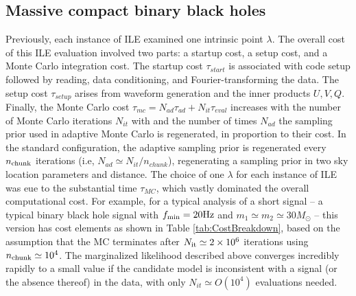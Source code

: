 \documentclass[twocolumn,prd,nofootinbib]{revtex4}
\newcommand\unit[1]{{\rm #1}}
\begin{document}
\subsection{Massive compact binary black holes}
Previously, each instance of ILE examined one intrinsic point $\lambda$.  The overall cost of this ILE evaluation
involved two parts: a startup cost, a setup cost, and a Monte Carlo integration cost.  The  startup cost $\tau_{start}$
is associated with code setup followed by reading, data conditioning, and Fourier-transforming the
data.  The setup cost $\tau_{setup}$ arises from waveform generation and  the inner products $U,V,Q$.  Finally, the Monte Carlo
cost $\tau_{mc}=N_{ad} \tau_{ad}+N_{it}\tau_{eval}$ increases with the number of Monte Carlo iterations $N_{it}$ with
and the number of times $N_{ad}$ the sampling prior used in adaptive Monte Carlo is regenerated, in proportion to their
cost.   In the standard configuration, the adaptive sampling prior is regenerated every $n_{\rm chunk}$ iterations (i.e,
 $N_{ad} \simeq N_{it}/n_{chunk}$), regenerating a sampling prior in two sky location parameters and distance.  
The choice of one $\lambda$ for each instance of ILE was eue to the substantial time  $\tau_{MC}$, which vastly
dominated the overall computational cost.   For example, for a typical analysis of a short signal --  a typical binary
black hole signal with $f_{\rm min}=20 \unit{Hz}$ and $m_1\simeq m_2\simeq 30 M_\odot$ --  this version has
cost elements as shown in Table \ref{tab:CostBreakdown}, based on the assumption that the MC terminates after $N_{\rm it}\simeq 2\times 10^6$ iterations using
$n_{\rm chunk}\simeq 10^4$.  
The marginalized likelihood described above  converges incredibly rapidly to a small value if the candidate model is
inconsistent with a signal (or the absence thereof) in the data, with only $N_{it} \simeq O(10^4)$  evaluations needed.
\end{document}
